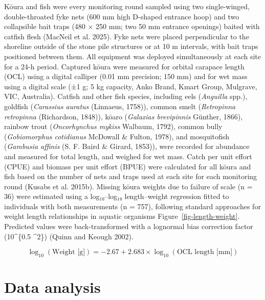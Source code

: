 \documentclass[
  12pt,
  a4paper,
]{scrbook}
\begin{document}
Kōura and fish were every monitoring round sampled using two
single-winged, double-throated fyke nets (600 mm high D-shaped entrance
hoop) and two collapsible bait traps (480 × 250 mm; two 50 mm entrance
openings) baited with catfish flesh (MacNeil et al. 2025). Fyke nets
were placed perpendicular to the shoreline outside of the stone pile
structures or at 10 m intervals, with bait traps positioned between
them. All equipment was deployed simultaneously at each site for a 24-h
period. Captured kōura were measured for orbital carapace length (OCL)
using a digital calliper (0.01 mm precision; 150 mm) and for wet mass
using a digital scale (±1 g; 5 kg capacity, Anko Brand, Kmart Group,
Mulgrave, VIC, Australia). Catfish and other fish species, including
eels (\emph{Anguilla} spp.), goldfish (\emph{Carassius auratus}
(Linnaeus, 1758)), common smelt (\emph{Retropinna retropinna}
(Richardson, 1848)), kōaro (\emph{Galaxias brevipinnis} Günther, 1866),
rainbow trout (\emph{Oncorhynchus mykiss} Walbaum, 1792), common bully
(\emph{Gobiomorphus cotidianus} McDowall \& Fulton, 1978), and
mosquitofish (\emph{Gambusia affinis} (S. F. Baird \& Girard, 1853)),
were recorded for abundance and measured for total length, and weighed
for wet mass. Catch per unit effort (CPUE) and biomass per unit effort
(BPUE) were calculated for all kōura and fish based on the number of
nets and traps used at each site for each monitoring round (Kusabs et
al. 2015b). Missing kōura weights due to failure of scale (n = 36) were
estimated using a log₁₀--log₁₀ length--weight regression fitted to
individuals with both measurements (n = 757), following standard
approaches for weight length relationships in aquatic organisms
Figure~\ref{fig-length-weight}. Predicted values were back-transformed
with a lognormal bias correction factor (10\^{}\{0.5
\cdot \sigma\^{}2\}) (Quinn and Keough 2002).

\[
\log_{10}(\text{Weight [g]}) = -2.67 + 2.683 \times \log_{10}(\text{OCL length [mm]})
\]

\section{Data analysis}\label{data-analysis-2}
\end{document}
